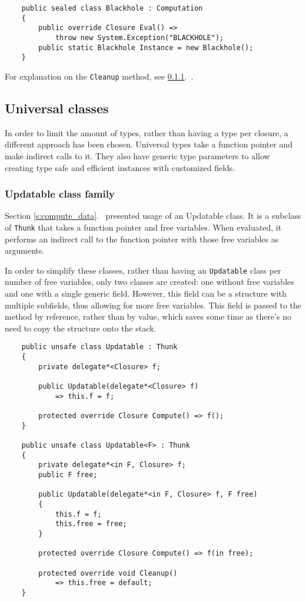 \documentclass[en]{pracamgr}
\newcommand{\myref}[1]{\ref{#1}.~\textit{\nameref{#1}}}
\begin{document}
\begin{verbatim}
    public sealed class Blackhole : Computation
    {
        public override Closure Eval() =>
            throw new System.Exception("BLACKHOLE");
        public static Blackhole Instance = new Blackhole();
    }
\end{verbatim}

For explanation on the \texttt{Cleanup} method, see \myref{s:updatables}.

\subsection{Universal classes}

In order to limit the amount of types, rather than having
a type per closure, a different approach has been chosen.
Universal types take a function pointer and make
indirect calls to it.
They also have generic type parameters to allow creating
type safe and efficient instances with customized fields.

\subsubsection{Updatable class family}\label{s:updatables}

Section \myref{s:compute_data} presented usage of an Updatable class.
It is a subclass of \texttt{Thunk} that takes a function
pointer and free variables. When evaluated, it performs an
indirect call to the function pointer with those free variables as arguments.

In order to simplify these classes, rather than having
an \texttt{Updatable} class per number of free variables,
only two classes are created:
one without free variables and one with a single generic
field. However, this field can be a structure with multiple
subfields, thus allowing for more free variables.
This field is passed to the method by reference, rather
than by value, which saves some time as there's no need to copy the structure onto the stack.

\begin{verbatim}
    public unsafe class Updatable : Thunk
    {
        private delegate*<Closure> f;

        public Updatable(delegate*<Closure> f)
            => this.f = f;

        protected override Closure Compute() => f();
    }

    public unsafe class Updatable<F> : Thunk
    {
        private delegate*<in F, Closure> f;
        public F free;

        public Updatable(delegate*<in F, Closure> f, F free)
        {
            this.f = f;
            this.free = free;
        }

        protected override Closure Compute() => f(in free);
        
        protected override void Cleanup()
            => this.free = default;
    }
\end{verbatim}
\end{document}
